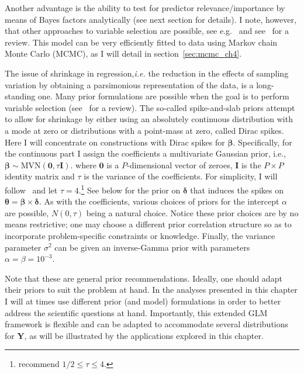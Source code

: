 Another advantage is the ability to test for predictor relevance/importance by means of Bayes factors analytically (see next section for details).
I note, however, that other approaches to variable selection are possible, see e.g.~\cite{Mitchell1988,George1993} and see~\cite{OHara2009} for a review.
This model can be very efficiently fitted to data using Markov chain Monte Carlo (MCMC), as I will detail in section~\ref{sec:mcmc_ch4}.

The issue of shrinkage in regression,\textit{i.e.} the reduction in the effects of sampling variation by obtaining a parsimonious representation of the data, is a long-standing one.
Many prior formulations are possible when the goal is to perform variable selection (see~\cite{Malsiner2016} for a review).
The so-called spike-and-slab priors attempt to allow for shrinkage by either using an absolutely continuous distribution with a mode at zero or distributions with a point-mass at zero, called Dirac spikes.
Here I will concentrate on constructions with Dirac spikes for $\boldsymbol\beta$.
Specifically, for the continuous part I  assign the coefficients a multivariate Gaussian prior, i.e., $\boldsymbol\beta \sim \text{MVN}(\boldsymbol 0, \tau \boldsymbol I)$.
where $\boldsymbol 0$ is a $P$-dimensional vector of zeroes, $\boldsymbol I$ is the $P \times P$ identity matrix and $\tau$ is the variance of the coefficients.
For simplicity, I will follow~\cite{Lemey2014} and let $\tau = 4$.\footnote{\cite{Kuo1998} recommend $1/2 \leq \tau \leq 4$.}
See below for the prior on $\boldsymbol\delta$ that induces the spikes on $\boldsymbol\theta = \boldsymbol\beta \times \boldsymbol\delta$.
As with the coefficients, various choices of priors for the intercept $\alpha$ are possible,  $N(0, \tau)$ being a natural choice.
Notice these prior choices are by no means restrictive; one may choose a different prior correlation structure so as to incorporate problem-specific constraints or knowledge.
Finally, the variance parameter $\sigma^2$  can be given an inverse-Gamma prior with parameters $\alpha = \beta = 10^{-3}$.

Note that these are general prior recommendations.
Ideally, one should adapt their priors to suit the problem at hand.
In the analyses presented in this chapter I will at times use different prior (and model) formulations in order to better address the scientific questions at hand. 
Importantly, this extended GLM framework is flexible and can be adapted to accommodate several distributions for $\boldsymbol Y$, as will be illustrated by the applications explored in this chapter.

